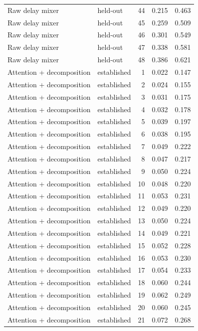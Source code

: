 \begin{tabular}{llrrr}
Raw delay mixer & held-out & 44 & 0.215 & 0.463 \\
Raw delay mixer & held-out & 45 & 0.259 & 0.509 \\
Raw delay mixer & held-out & 46 & 0.301 & 0.549 \\
Raw delay mixer & held-out & 47 & 0.338 & 0.581 \\
Raw delay mixer & held-out & 48 & 0.386 & 0.621 \\
Attention + decomposition & established & 1 & 0.022 & 0.147 \\
Attention + decomposition & established & 2 & 0.024 & 0.155 \\
Attention + decomposition & established & 3 & 0.031 & 0.175 \\
Attention + decomposition & established & 4 & 0.032 & 0.178 \\
Attention + decomposition & established & 5 & 0.039 & 0.197 \\
Attention + decomposition & established & 6 & 0.038 & 0.195 \\
Attention + decomposition & established & 7 & 0.049 & 0.222 \\
Attention + decomposition & established & 8 & 0.047 & 0.217 \\
Attention + decomposition & established & 9 & 0.050 & 0.224 \\
Attention + decomposition & established & 10 & 0.048 & 0.220 \\
Attention + decomposition & established & 11 & 0.053 & 0.231 \\
Attention + decomposition & established & 12 & 0.049 & 0.220 \\
Attention + decomposition & established & 13 & 0.050 & 0.224 \\
Attention + decomposition & established & 14 & 0.049 & 0.221 \\
Attention + decomposition & established & 15 & 0.052 & 0.228 \\
Attention + decomposition & established & 16 & 0.053 & 0.230 \\
Attention + decomposition & established & 17 & 0.054 & 0.233 \\
Attention + decomposition & established & 18 & 0.060 & 0.244 \\
Attention + decomposition & established & 19 & 0.062 & 0.249 \\
Attention + decomposition & established & 20 & 0.060 & 0.245 \\
Attention + decomposition & established & 21 & 0.072 & 0.268 \\

\end{tabular}
